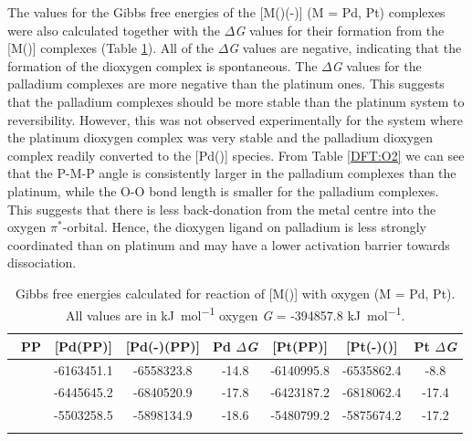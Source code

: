 The values for the Gibbs free energies of the [M(\tBuxantphos)(-)] (M = Pd, Pt) complexes were also calculated together with the $\Delta$\emph{G} values for their formation from the [M(\tBuxantphos)] complexes (Table \ref{DFT:O2energy}).  All of the $\Delta$\emph{G} values are negative, indicating that the formation of the dioxygen complex is spontaneous.  The $\Delta$\emph{G} values for the palladium complexes are more negative than the platinum ones.  This suggests that the palladium complexes should be more stable than the platinum system to reversibility.  However, this was not observed experimentally for the \tButhixantphos{} system where the platinum dioxygen complex was very stable and the palladium dioxygen complex readily converted to the [Pd(\tButhixantphos)] species.  From Table \ref{DFT:O2} we can see that the P-M-P angle is consistently larger in the palladium complexes than the platinum, while the O-O bond length is smaller for the palladium complexes.  This suggests that there is less back-donation from the metal centre into the oxygen $\pi^*$-orbital.  Hence, the dioxygen ligand on palladium is less strongly coordinated than on platinum and may have a lower activation barrier towards dissociation.  

\begin{table}
\caption[Gibbs free energies calculated for the formation of [M(\tBuxantphos)(-){]}]{Gibbs free energies calculated for reaction of [M(\tBuxantphos)] with oxygen (M = Pd, Pt).  All values are in \si{\kilo\joule\per\mole} oxygen \emph{G} = -394857.8 \si{\kilo\joule\per\mole}.}
\vspace{1em}
\label{DFT:O2energy}
\small
\begin{center}
\begin{tabular}{l c c c c c c}
	\toprule
	~\bfseries{PP} & \bfseries{{[}Pd(PP)]} & \bfseries{{[}Pd(\hapto{}-\ce{O2})(PP)]} & \bfseries{Pd $\Delta$\emph{G}} & \bfseries{{[}Pt(PP)]} & \bfseries{{[}Pt(\hapto{}-\ce{O2})(\tBuxantphos)]} & \bfseries{Pt $\Delta$\emph{G}} \\
	\midrule		
	~\tBuSixantphos	& -6163451.1	& -6558323.8 & -14.8 & -6140995.8 & -6535862.4 & -8.8 \\
	~\tBuThixantphos	& -6445645.2	& -6840520.9 & -17.8 & -6423187.2 & -6818062.4 & -17.4 \\
	~\tBuXantphos{}	& -5503258.5	& -5898134.9 & -18.6 & -5480799.2 & -5875674.2 & -17.2 \\
	\bottomrule{}
\end{tabular}
\end{center}
\end{table}

